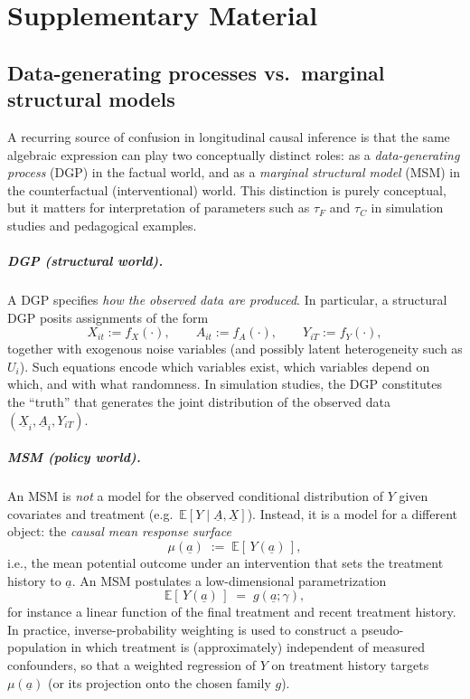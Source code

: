 \chapter{Supplementary Material}
\section{Data-generating processes vs.\ marginal structural models}
\label{sec:dgp_vs_msm}

A recurring source of confusion in longitudinal causal inference is that the same algebraic expression can play two conceptually distinct roles: as a \emph{data-generating process} (DGP) in the factual world, and as a \emph{marginal structural model} (MSM) in the counterfactual (interventional) world. This distinction is purely conceptual, but it matters for interpretation of parameters such as $\tau_F$ and $\tau_C$ in simulation studies and pedagogical examples.

\paragraph{DGP (structural world).}
A DGP specifies \emph{how the observed data are produced}. In particular, a structural DGP posits assignments of the form
\[
X_{it} := f_X(\cdot), \qquad
A_{it} := f_A(\cdot), \qquad
Y_{iT} := f_Y(\cdot),
\]
together with exogenous noise variables (and possibly latent heterogeneity such as $U_i$). Such equations encode which variables exist, which variables depend on which, and with what randomness. In simulation studies, the DGP constitutes the ``truth'' that generates the joint distribution of the observed data $(\underline X_i, \underline A_i, Y_{iT})$.

\paragraph{MSM (policy world).}
An MSM is \emph{not} a model for the observed conditional distribution of $Y$ given covariates and treatment (e.g.\ $\mathbb E[Y\mid \underline A, \underline X]$). Instead, it is a model for a different object: the \emph{causal mean response surface}
\[
\mu(\underline a) \;:=\; \mathbb E\!\left[\,Y(\underline a)\,\right],
\]
i.e., the mean potential outcome under an intervention that sets the treatment history to $\underline a$. An MSM postulates a low-dimensional parametrization
\[
\mathbb E\!\left[\,Y(\underline a)\,\right] \;=\; g(\underline a;\gamma),
\]
for instance a linear function of the final treatment and recent treatment history. In practice, inverse-probability weighting is used to construct a pseudo-population in which treatment is (approximately) independent of measured confounders, so that a weighted regression of $Y$ on treatment history targets $\mu(\underline a)$ (or its projection onto the chosen family $g$).

